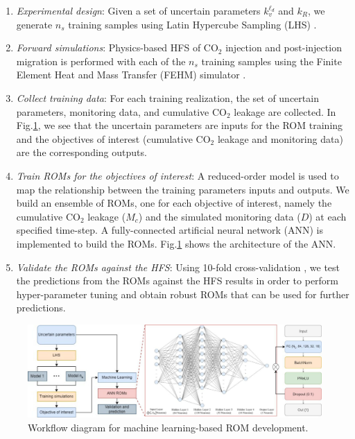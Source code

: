 \documentclass[a4paper,fleqn]{cas-sc}
\begin{document}
\begin{enumerate}[Step 1.]
\item \textit{Experimental design}: Given a set of uncertain parameters $k_{v}^{\ell_d}$ and $k_R$, we generate $n_s$ training samples using Latin Hypercube Sampling (LHS) \citep{Iman2008, Helton2003LatinSystems}.
\item \textit{Forward simulations}: Physics-based HFS of CO$_2$ injection and post-injection migration is performed with each of the $n_s$ training samples using the Finite Element Heat and Mass Transfer (FEHM) simulator \citep{Zyvoloski1997}. 
\item \textit{Collect training data}: For each training realization, the set of uncertain parameters, monitoring data, and cumulative CO$_2$ leakage are collected. In Fig.\ref{mlrom}, we see that the uncertain parameters are inputs for the ROM training and the objectives of interest (cumulative CO$_2$ leakage and monitoring data) are the corresponding outputs. 
\item \textit{Train ROMs for the objectives of interest}: A reduced-order model is used to map the relationship between the training parameters inputs and outputs. We build an ensemble of ROMs, one for each objective of interest, namely the cumulative CO$_2$ leakage ($M_c$) and the simulated monitoring data ($D$) at each specified time-step. A fully-connected artificial neural network (ANN) is implemented to build the ROMs. Fig.\ref{mlrom} shows the architecture of the ANN.
\item \textit{Validate the ROMs against the HFS}: Using 10-fold cross-validation \citep{Xu2018249}, we test the predictions from the ROMs against the HFS results in order to perform hyper-parameter tuning and obtain robust ROMs that can be used for further predictions.
\end{enumerate}

\begin{figure}
    \centering
    \includegraphics[width=16cm]{figs/Figure 1.pdf}
    \caption{Workflow diagram for machine learning-based ROM development.}
    \label{mlrom}
\end{figure}
\end{document}
